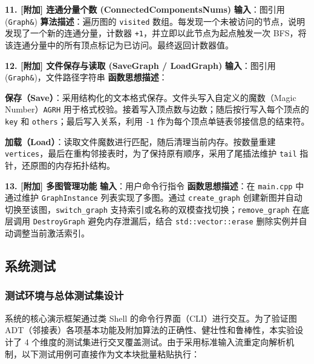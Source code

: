 \documentclass[supercite]{Experimental_Report}
\theoremstyle{definition}
\begin{document}
\vspace{0.5em}
\noindent\textbf{11. [附加] 连通分量个数 (ConnectedComponentsNums)}
\newline\textbf{输入}：图引用 (\texttt{Graph\&})
\newline\textbf{算法描述}：遍历图的 \texttt{visited} 数组。每发现一个未被访问的节点，说明发现了一个新的连通分量，计数器 \texttt{+1}，并立即以此节点为起点触发一次 BFS，将该连通分量中的所有顶点标记为已访问。最终返回计数器值。

\vspace{0.5em}
\noindent\textbf{12. [附加] 文件保存与读取 (SaveGraph / LoadGraph)}
\newline\textbf{输入}：图引用 (\texttt{Graph\&})，文件路径字符串
\newline\textbf{函数思想描述}：

\textbf{保存（Save）}：采用结构化的文本格式保存。文件头写入自定义的魔数（Magic Number）\texttt{AGRH} 用于格式校验。接着写入顶点数与边数；随后按行写入每个顶点的 \texttt{key} 和 \texttt{others}；最后写入关系，利用 \texttt{-1} 作为每个顶点单链表邻接信息的结束符。

\textbf{加载（Load）}：读取文件魔数进行匹配，随后清理当前内存。按数量重建 \texttt{vertices}，最后在重构邻接表时，为了保持原有顺序，采用了尾插法维护 \texttt{tail} 指针，还原图的内存拓扑结构。

\vspace{0.5em}
\noindent\textbf{13. [附加] 多图管理功能}
\newline\textbf{输入}：用户命令行指令
\newline\textbf{函数思想描述}：在 \texttt{main.cpp} 中通过维护 \texttt{GraphInstance} 列表实现了多图。通过 \texttt{create\_graph} 创建新图并自动切换至该图，\texttt{switch\_graph} 支持索引或名称的双模查找切换；\texttt{remove\_graph} 在底层调用 \texttt{DestroyGraph} 避免内存泄漏后，结合 \texttt{std::vector::erase} 删除实例并自动调整当前激活索引。

\subsection{系统测试}
\subsubsection{测试环境与总体测试集设计}
系统的核心演示框架通过类 Shell 的命令行界面（CLI）进行交互。为了验证图 ADT（邻接表）各项基本功能及附加算法的正确性、健壮性和鲁棒性，本实验设计了 4 个维度的测试集进行交叉覆盖测试。由于采用标准输入流重定向解析机制，以下测试用例可直接作为文本块批量粘贴执行：
\end{document}
